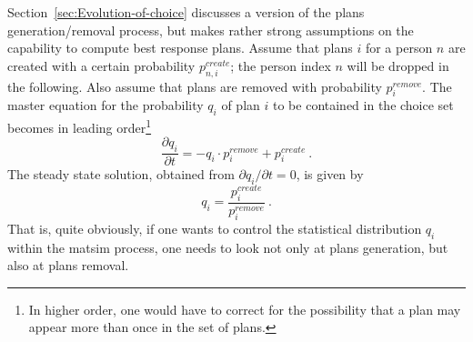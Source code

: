 Section~\ref{sec:Evolution-of-choice} discusses a version of the plans generation/removal process, but makes rather strong assumptions on the capability to compute best response plans.  
Assume that plans $i$ for a person $n$ are created with a certain probability $p^{create}_{n,i}$; the person index $n$ will be dropped in the following.  Also assume that plans are removed with probability $p^{remove}_{i}$.  The master equation for the probability $q_{i}$ of plan $i$ to be contained in the choice set becomes in leading order\footnote{%
%
In higher order, one would have to correct for the possibility that a plan may appear more than once in the set of plans.
%
}
\[
\frac{\partial q_{i}}{\partial t}
%
= - q_{i} \cdot p^{remove}_{i} + p^{create}_{i} \ .
\]
The steady state solution, obtained from $\partial q_{i}/\partial t = 0$, is given by
\begin{equation}
q_{i} = \frac{p^{create}_{i}}{p^{remove}_{i}} \ .
\label{eq:5}
\end{equation}
That is, quite obviously, if one wants to control the statistical distribution $q_{i}$ within the \gls{matsim} process, one needs to look not only at plans generation, but also at plans removal.


